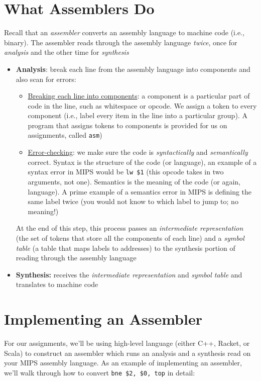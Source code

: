 \documentclass{report}
\begin{document}
\section{What Assemblers Do}
Recall that an \textit{assembler} converts an assembly language to machine code (i.e., binary). The assembler reads through the assembly language \textit{twice}, once for \textit{analysis} and the other time for \textit{synthesis}
\begin{itemize}
\item \textbf{Analysis}: break each line from the assembly language into components and also scan for errors:
\begin{itemize}
\item \underline{Breaking each line into components}: a component is a particular part of code in the line, such as whitespace or opcode. We assign a token to every component (i.e., label every item in the line into a particular group). A program that assigns tokens to components is provided for us on assignments, called \texttt{asm})
\item \underline{Error-checking}: we make sure the code is \textit{syntactically} and \textit{semantically} correct. Syntax is the structure of the code (or language), an example of a syntax error in MIPS would be \texttt{lw \$1} (this opcode takes in two arguments, not one). Semantics is the meaning of the code (or again, language). A prime example of a semantics error in MIPS is defining the same label twice (you would not know to which label to jump to; no meaning!)
\end{itemize}
At the end of this step, this process passes an \textit{intermediate representation} (the set of tokens that store all the components of each line) and a \textit{symbol table} (a table that maps labels to addresses) to the synthesis portion of reading through the assembly language
\item \textbf{Synthesis:} receives the \textit{intermediate representation} and \textit{symbol table} and translates to machine code
\end{itemize}
\section{Implementing an Assembler}
For our assignments, we'll be using high-level language (either C++, Racket, or Scala) to construct an assembler which runs an analysis and a synthesis read on your MIPS assembly language.
As an example of implementing an assembler, we'll walk through how to convert \texttt{bne \$2, \$0, top} in detail:
\end{document}
